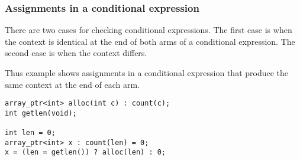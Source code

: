 \begin{small}
\end{small}

\subsubsection{Assignments in a conditional expression}

There are two cases for checking conditional expressions. The first case is when the context is identical
at the end of both arms of a conditional expression. The second case is when the context differs.

Thus example shows assignments in a conditional expression that produce the same context at
the end of each arm.
\begin{lstlisting}
array_ptr<int> alloc(int c) : count(c);
int getlen(void);

int len = 0;
array_ptr<int> x : count(len) = 0;
x = (len = getlen()) ? alloc(len) : 0;
\end{lstlisting}

